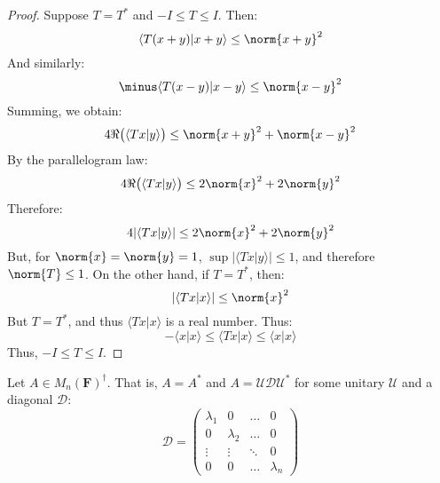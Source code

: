     \begin{proof}
        Suppose $T=T^{*}$ and $\minus{I}\leq{T}\leq{I}$.
        Then:
        \begin{equation}
            \langle{T(x+y)|x+y}\rangle
            \leq\norm{x+y}^{2}
        \end{equation}
        And similarly:
        \begin{equation}
            \minus\langle{T(x-y)|x-y}\rangle
            \leq\norm{x-y}^{2}
        \end{equation}
        Summing, we obtain:
        \begin{equation}
            4\Re\big(\langle{Tx|y}\rangle\big)
            \leq\norm{x+y}^{2}+\norm{x-y}^{2}
        \end{equation}
        By the parallelogram law:
        \begin{equation}
            4\Re\big(\langle{Tx|y}\rangle\big)
            \leq{2}\norm{x}^{2}+2\norm{y}^{2}
        \end{equation}
        Therefore:
        \begin{equation}
            4|\langle{Tx|y}\rangle|
            \leq{2}\norm{x}^{2}+2\norm{y}^{2}
        \end{equation}
        But, for $\norm{x}=\norm{y}=1$,
        $\sup|\langle{Tx|y}\rangle|\leq{1}$, and therefore
        $\norm{T}\leq{1}$. On the other hand, if
        $T=T^{*}$, then:
        \begin{equation}
            |\langle{Tx|x}\rangle|\leq\norm{x}^{2}
        \end{equation}
        But $T=T^{*}$, and thus
        $\langle{Tx|x}\rangle$ is a real number. Thus:
        \begin{equation}
            \minus\langle{x|x}\rangle
            \leq\langle{Tx|x}\rangle
            \leq\langle{x|x}\rangle
        \end{equation}
        Thus, $\minus{I}\leq{T}\leq{I}$.
    \end{proof}
    Let $A\in{M}_{n}(\mathbf{F})^{\dagger}$. That is,
    $A=A^{*}$ and $A=\mathcal{U}\mathcal{D}\mathcal{U}^{*}$
    for some unitary $\mathcal{U}$ and a diagonal
    $\mathcal{D}$:
    \begin{equation}
        \mathcal{D}=
            \begin{pmatrix}
                \lambda_{1}&0&\dots&0\\
                0&\lambda_{2}&\dots&0\\
                \vdots&\vdots&\ddots&0\\
                0&0&\dots&\lambda_{n}
            \end{pmatrix}
    \end{equation}
